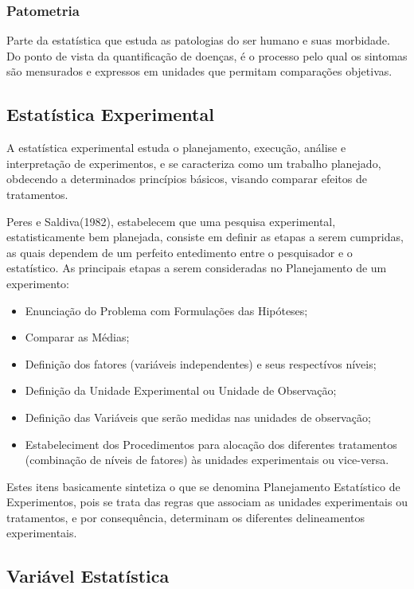 \subsubsection{Patometria}

Parte da estatística que estuda as patologias do ser humano e suas morbidade. Do ponto de vista da quantificação de doenças, é o processo pelo qual os sintomas são mensurados e expressos em unidades que permitam comparações objetivas.



\subsection{Estatística Experimental}

A estatística experimental estuda o planejamento, execução, análise e interpretação de experimentos, e se caracteriza como um trabalho planejado, obdecendo a determinados princípios básicos, visando comparar efeitos de tratamentos.\vskip0.3cm

Peres e Saldiva(1982), estabelecem que uma pesquisa experimental, estatisticamente bem planejada, consiste em definir as etapas a serem cumpridas, as quais dependem de um perfeito entedimento entre o pesquisador e o estatístico. As principais etapas a serem consideradas no Planejamento de um experimento:

\begin{itemize}
    \item Enunciação do Problema com Formulações das Hipóteses;
    \item Comparar as Médias;
    \item Definição dos fatores (variáveis independentes) e seus respectívos níveis;
    \item Definição da Unidade Experimental ou Unidade de Observação;
    \item Definição das Variáveis que serão medidas nas unidades de observação;
    \item Estabeleciment dos Procedimentos para alocação dos diferentes tratamentos (combinação de níveis de fatores) às unidades experimentais ou vice-versa.
\end{itemize}

Estes itens basicamente sintetiza o que se denomina Planejamento Estatístico de Experimentos, pois se trata das regras que associam as unidades experimentais ou tratamentos, e por consequência, determinam os diferentes delineamentos experimentais.   


\newpage
\subsection{Variável Estatística}

